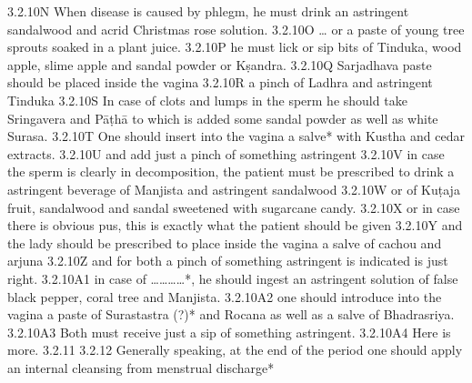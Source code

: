 \begin{translation}
  3.2.10N When disease is caused by phlegm, he must drink an astringent 
  sandalwood and acrid Christmas rose solution.
  3.2.10O … or a paste of young tree sprouts soaked in a plant juice.
  3.2.10P he must lick or sip bits of Tinduka, wood apple, slime apple and sandal 
  powder or Kṣandra.
  3.2.10Q  Sarjadhava paste should be placed inside the vagina
  3.2.10R a pinch of Ladhra and astringent Tinduka
  3.2.10S In case of clots and lumps in the sperm he should take Sringavera and 
  Pāṭhā to which is added some sandal powder as well as white Surasa.
  3.2.10T One should insert into the vagina a salve* with Kustha and cedar 
  extracts.
  3.2.10U and add just a pinch of something astringent
  3.2.10V in case the sperm is clearly in decomposition, the patient must be 
  prescribed to drink a astringent beverage of Manjista and astringent sandalwood
  3.2.10W or of Kuṭaja fruit, sandalwood and sandal sweetened with sugarcane 
  candy.
  3.2.10X or in case there is obvious pus, this is exactly what the patient should 
  be given
  3.2.10Y  and the lady should be prescribed to place  inside the vagina a salve of 
  cachou and arjuna
  3.2.10Z and for both a pinch of something astringent is indicated is just right.
  3.2.10A1 in case of …………*, he should ingest an astringent solution of false 
  black pepper, coral tree and Manjista.
  3.2.10A2 one should introduce into the vagina a paste of Surastastra (?)* and 
  Rocana as well as  a salve of Bhadrasriya.
  3.2.10A3 Both must receive just a sip of something astringent.
  3.2.10A4 Here is more.
  3.2.11 
  3.2.12 Generally speaking, at the end of the period one should apply an internal 
  cleansing from menstrual discharge*
  

\end{translation}
